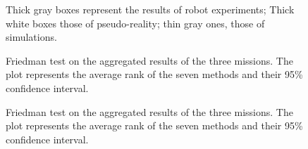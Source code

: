 \documentclass{article}
\begin{document}
\begin{figure}[t]
\centering

\hfill

\hfill

\caption{
Thick gray boxes represent the results of robot experiments;
Thick white boxes those of pseudo-reality; thin gray ones,
those of simulations.}
\label{fig:task1res}
\end{figure}

\begin{figure}[t]
\centering

\caption{Friedman test on the aggregated results of the three missions. The
  plot represents the average rank of the seven methods and their
  95\% confidence interval. }
\label{fig:friedmanSIM}
\end{figure}

\begin{figure}[t]
\centering

\caption{Friedman test on the aggregated results of the three missions. The
  plot represents the average rank of the seven methods and their
  95\% confidence interval. }
\label{fig:friedmanPR}
\end{figure}
\end{document}
